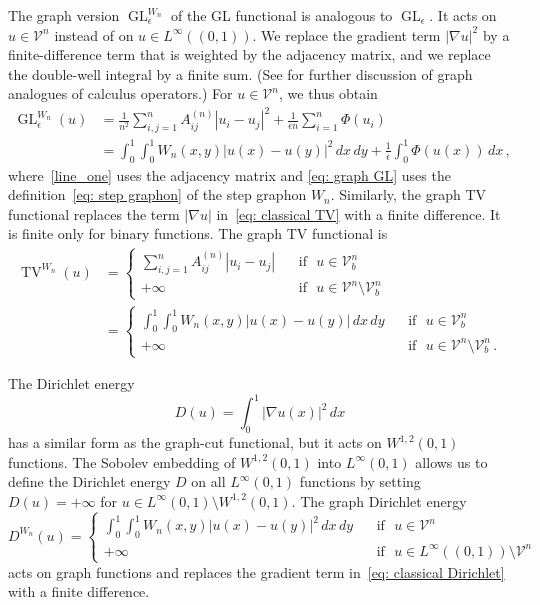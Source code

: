 \documentclass[11pt]{amsart}
\def\ep{\epsilon}
\def\calV{\mathcal{V}}
\def\GL{\operatorname{GL}}
\def\TV{\operatorname{TV}}
\numberwithin{equation}{section}
\begin{document}
{The graph version $\GL^{W_n}_\ep$ of the GL functional is analogous to $\GL_\ep$. It acts on $u \in \mathcal{V}^n$ {instead} of on $u\in L^\infty((0,1))$. We replace the gradient term $|\nabla u|^2$ by a finite-difference term that is weighted by the adjacency matrix, and we replace the double-well integral by a finite sum. (See {\cite[Section 2.2]{van2012gamma}} for further discussion of graph analogues of calculus operators.) {For $u \in \calV^n$,} we thus obtain 
\begin{align} 
    \GL^{W_n}_\ep (u) &= \frac{1}{n^2}\sum_{i,j = 1}^n A^{(n)}_{ij} |u_i - u_j|^2 + \frac{1}{\ep n} \sum_{i = 1}^n \Phi(u_i) \label{line_one} \\
   		 &= \int_0^1\int_0^1 W_n(x,y)|u(x) - u(y)|^2 \, dx \, dy + \frac{1}{\ep} \int_0^1 \Phi(u(x))\,dx \,, \label{eq: graph GL}
\end{align}
where~\eqref{line_one} uses the adjacency matrix and \eqref{eq: graph GL} {uses the definition~\eqref{eq: step graphon} of} the step graphon $W_n$. Similarly, the graph TV functional replaces the term $|\nabla u|$ in~\eqref{eq: classical TV} with a finite difference. It is finite only for binary functions. The graph TV functional is
\begin{align} 
    \TV^{W_n}(u) &= \begin{cases}
        \sum_{i,j=1}^n A^{(n)}_{ij} |u_i - u_j| \;\; &\text{ if } \,\, u \in \mathcal{V}^n_b 
        \\
        +\infty \;\; &\text{ if } \,\, u \in \mathcal{V}^n \setminus \mathcal{V}^n_b 
    \end{cases} \label{eq: graph TV discrete}
    \\
    &= \begin{cases}
    			\int_0^1 \int_0^1 W_n(x,y) |u(x)-u(y)| \,dx\,dy \;\; &\text{ if } \,\, u \in \mathcal{V}^n_b   \\
			    + \infty \;\; &\text{ if } \,\, u \in \mathcal{V}^n \setminus \mathcal{V}^n_b \,. 
\end{cases} \label{eq: graph TV}
\end{align}

The Dirichlet energy 
\begin{equation}\label{eq: classical Dirichlet}
    D(u) = \int_0^1 |\nabla u(x)|^2 \,dx 
\end{equation}
{has a similar form {as}} the graph-cut functional, but it acts on $W^{1,2}(0,1)$ functions. The Sobolev embedding of $W^{1,2}(0,1)$ into $L^\infty(0,1)$ allows us to define the Dirichlet energy $D$ on all $L^\infty(0,1)$ functions by setting $D(u) = +\infty$ for $u \in L^\infty(0,1) \setminus W^{1,2}(0,1)$.
The graph Dirichlet energy 
\begin{equation} \label{eq: graph dirichlet}
    D^{W_n}(u) = \begin{cases}
        \int_0^1\int_0^1 W_n(x,y) |u(x)-u(y)|^2 \,dx\,dy \;\; &\text{ if } \,\, u \in \mathcal{V}^n
        \\
        +\infty \;\; &\text{ if } \,\, u \in L^\infty((0,1))\setminus \mathcal{V}^n
    \end{cases}
\end{equation}
acts on graph functions and replaces the gradient term in~\eqref{eq: classical Dirichlet} with a finite difference.  

}
\end{document}
